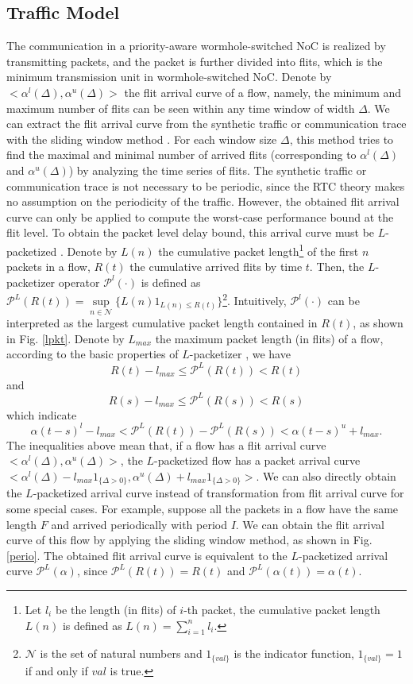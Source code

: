 \documentclass[10pt,journal]{IEEEtran}
\begin{document}
\subsection{Traffic Model}\label{traffic}
The communication in a priority-aware wormhole-switched NoC is realized by transmitting packets, and the packet is further divided into flits, which is the minimum transmission unit in wormhole-switched NoC. Denote by $<\alpha^l(\Delta),\alpha^u(\Delta)>$ the flit arrival curve of a flow, namely, the minimum and maximum number of flits can be seen within any time window of width $\Delta$. We can extract the flit arrival curve from the synthetic traffic or communication trace with the sliding window method \cite{1253607}. For each window size $\Delta$, this method tries to find the maximal and minimal number of arrived flits (corresponding to $\alpha^l(\Delta)$ and $\alpha^u(\Delta)$) by analyzing the time series of flits. The synthetic traffic or communication trace is not necessary to be periodic, since the RTC theory makes no assumption on the periodicity of the traffic. However, the obtained flit arrival curve can only be applied to compute the worst-case performance bound at the flit level. To obtain the packet level delay bound, this arrival curve must be $L$-packetized \cite{Boudec2001Network}. Denote by $L(n)$ the cumulative packet length\footnote{Let $l_i$ be the length (in flits) of $i$-th packet, the cumulative packet length $L(n)$ is defined as $L(n)=\sum_{i=1}^n l_i$.} of the first $n$ packets in a flow, $R(t)$ the cumulative arrived flits by time $t$. Then, the $L$-packetizer operator $\mathcal{P}^l(\cdot)$ is defined as $\mathcal{P}^L(R(t))=\underset{n\in\mathcal{N}}{\sup}\{L(n)1_{L(n)\leq R(t)}\}$\footnote{$\mathcal{N}$ is the set of natural numbers and $1_{\{val\}}$ is the indicator function, $1_{\{val\}}=1$ if and only if $val$ is true.}. Intuitively, $\mathcal{P}^l(\cdot)$ can be interpreted as the largest cumulative packet length contained in $R(t)$, as shown in Fig. \ref{lpkt}. Denote by $L_{max}$ the maximum packet length (in flits) of a flow, according to the basic properties of $L$-packetizer \cite{Boudec2001Network}, we have
$$R(t)-l_{max}\leq \mathcal{P}^L(R(t))<R(t)$$
and
$$R(s)-l_{max}\leq \mathcal{P}^L(R(s))<R(s)$$
which indicate
$$\alpha(t-s)^l-l_{max}<\mathcal{P}^L(R(t))-\mathcal{P}^L(R(s))<\alpha(t-s)^u+l_{max}.$$
The inequalities above mean that, if a flow has a flit arrival curve $<\alpha^l(\Delta),\alpha^u(\Delta)>$, the $L$-packetized flow has a packet arrival curve $<\alpha^l(\Delta)-l_{max}1_{\{\Delta>0\}},\alpha^u(\Delta)+l_{max}1_{\{\Delta>0\}}>$. We can also directly obtain the $L$-packetized arrival curve instead of transformation from flit arrival curve for some special cases. For example, suppose all the packets in a flow have the same length $F$ and arrived periodically with period $I$. We can obtain the flit arrival curve of this flow by applying the sliding window method, as shown in Fig. \ref{perio}. The obtained flit arrival curve is equivalent to the $L$-packetized arrival curve $\mathcal{P}^L(\alpha)$, since $\mathcal{P}^L(R(t))=R(t)$ and $\mathcal{P}^L(\alpha(t))=\alpha(t)$.
\end{document}
